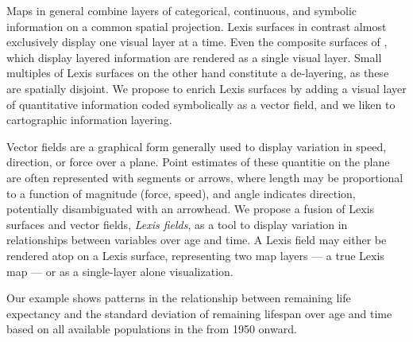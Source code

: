 \documentclass{article}
\begin{document}
Maps in general combine layers of categorical, continuous, and
symbolic information on a common spatial projection. Lexis surfaces in contrast almost exclusively display one visual layer at a time. Even the composite surfaces of \citet{scholey2017visualizing}, which display layered information are rendered as a single visual layer. Small multiples of Lexis surfaces on the other hand constitute a de-layering, as these are spatially disjoint. We propose to enrich Lexis surfaces by adding a visual layer of quantitative information coded symbolically as a vector field, and we liken to cartographic information layering.

Vector fields are a graphical form generally used to display variation in speed,
direction, or force over a plane. Point estimates of these quantitie on the plane are
often represented with segments or arrows, where length may be proportional to a function of
magnitude (force, speed), and angle indicates direction, potentially disambiguated with an arrowhead. We propose a fusion of Lexis surfaces and vector fields, \emph{Lexis fields}, as a tool to
display variation in relationships between variables over age and time. A Lexis field may either be rendered atop on a Lexis surface, representing two map layers --- a true Lexis map --- or as a single-layer alone visualization. 

Our example shows patterns in the relationship between remaining life expectancy and
the standard deviation of remaining lifespan over age and time based on all
available populations in the \citet{HMD} from 1950 onward. 
\end{document}
